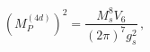 \begin{equation}
(M_P^{(4d)})^2 = \frac{ M_s^8 V_6 }{ (2 \pi)^7 g_s^2} \, ,\label{mpms}
\end{equation}

